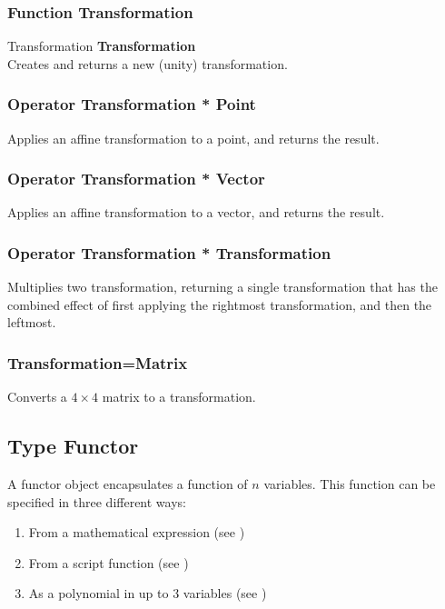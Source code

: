 \subsubsection{Function Transformation \label{F:Transformation}}
Transformation \textbf{Transformation} \\
Creates and returns a new (unity) transformation.

\subsubsection{Operator Transformation * Point \label{O:Transformation*Point}}
Applies an affine transformation to a point, and returns the result.

\subsubsection{Operator Transformation * Vector \label{O:Transformation*Vector}}
Applies an affine transformation to a vector, and returns the result.


\subsubsection{Operator Transformation * Transformation \label{O:Transformation*Transformation}}
Multiplies two transformation, returning a single transformation that has the combined effect of first applying the rightmost transformation, and then the leftmost.

\subsubsection{Transformation=Matrix \label{C:Transformation=Matrix}}
Converts a $4 \times 4$ matrix to a transformation.

\subsection{Type Functor \label{T:Functor}}
A functor object encapsulates a function of $n$ variables. This function can be specified in three different ways:
\begin{enumerate}
\item From a mathematical expression (see )
\item From a script function (see )
\item As a polynomial in up to 3 variables (see )
\end{enumerate}

